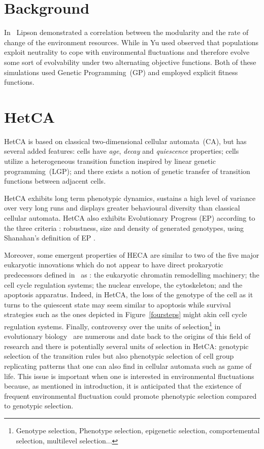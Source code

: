 \documentclass[letterpaper]{article}
\begin{document}
\section{Background}\label{sec:bground}
In~\citep{lipson2002origin} Lipson demonstrated a correlation between the modularity and the rate of change of the environment resources. While in \citep{yu2007program} Yu used observed that populations exploit neutrality to cope with environmental fluctuations and therefore evolve some sort of evolvability under two alternating objective functions. Both of these simulations used Genetic Programming~(GP) and employed explicit fitness functions.

\section{HetCA}\label{sec:hetca)}
HetCA is based on classical two-dimensional cellular automata~(CA), but has several added features: cells have \emph{age}, \emph{decay} and \emph{quiescence} properties; cells utilize a heterogeneous transition function inspired by linear genetic programming~(LGP); and there exists a notion of genetic transfer of transition functions between adjacent cells.

HetCA exhibits long term phenotypic dynamics, sustains a high level of variance over very long runs and displays greater behavioural diversity than classical cellular automata\citep{medernach2013long}. HetCA also exhibits Evolutionary Progress (EP) according to the three criteria : robustness, size and density of generated genotypes\citep{medernach2015evolutionary}, using Shanahan's definition of EP \citep{shanahan2012evolutionary}.

Moreover, some emergent properties of HECA are similar to two of the five major eukaryotic innovations which do not appear to have direct prokaryotic predecessors defined in~\citep{smith1997major} as : the eukaryotic chromatin remodelling machinery; the cell cycle regulation systems; the nuclear envelope, the cytoskeleton; and the apoptosis apparatus\citep{koonin2002origin}. Indeed, in HetCA, the loss of the genotype of the cell as it turns to the quiescent state may seem similar to apoptosis while survival strategies such as the ones depicted in Figure~\ref{foursteps} might akin cell cycle regulation systems.
Finally, controversy over the units of selection\footnote{Genotype selection, Phenotype selection, epigenetic selection, comportemental selection, multilevel selection...} in evolutionary biology~\citep{okasha2006evolution} are numerous and date back to the origins of this field of research and there is potentially several units of selection in HetCA: genotypic selection of the transition rules but also phenotypic selection of cell group replicating patterns that one can also find in cellular automata such as game of life.  This issue is important when one is interested in environmental fluctuations because, as mentioned in introduction, it is anticipated that the existence of frequent environmental fluctuation could promote phenotypic selection compared to genotypic selection.
\end{document}

